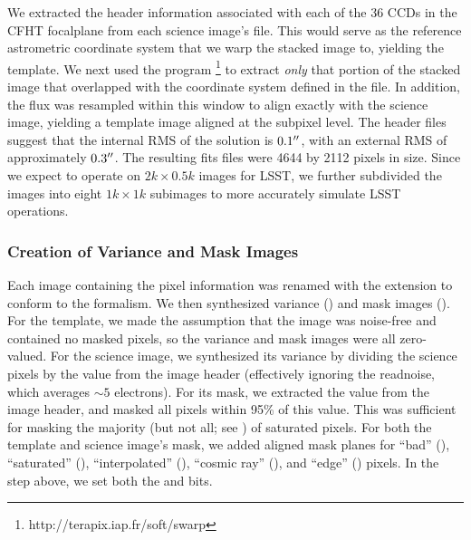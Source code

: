 We extracted the header information associated with each of the 36
CCDs in the CFHT focalplane from each science image's 
file.  This would serve as the reference astrometric coordinate system
that we warp the stacked image to, yielding the template.  We next
used the program
\footnote{http://terapix.iap.fr/soft/swarp} to extract
\textit{only} that portion of the stacked image that overlapped with
the coordinate system defined in the  file.  In addition,
the flux was resampled within this window to align exactly with the
science image, yielding a template image aligned at the subpixel
level.  The header files suggest that the internal RMS of the solution
is $0.1\mbox{$^{\prime\prime}$}$, with an external RMS of approximately $0.3\mbox{$^{\prime\prime}$}$.
%
%
The resulting fits files were 4644 by 2112 pixels in size.  Since we
expect to operate on $2k \times 0.5k$ images for LSST, we further
subdivided the images into eight $1k \times 1k$ subimages to more
accurately simulate LSST operations.

\subsubsection{Creation of Variance and Mask Images}\label{tInDat-vm}

Each image containing the pixel information was renamed with the
extension  to conform to the 
formalism.  We then synthesized variance () and mask
images ().  For the template, we made the assumption
that the image was noise-free and contained no masked pixels, so the
variance and mask images were all zero-valued.  For the science
image, we synthesized its variance by dividing the science pixels by
the  value from the image header (effectively ignoring the
readnoise, which averages $\sim 5$ electrons).  For its mask, we
extracted the  value from the image header, and masked
all pixels within 95\% of this value.  This was sufficient for masking
the majority (but not all; see
) of saturated pixels.  For
both the template and science image's mask, we added aligned mask
planes for ``bad'' (), ``saturated'' (),
``interpolated'' (), ``cosmic ray'' (),
and ``edge'' () pixels.  In the step above, we set
both the  and  bits.

